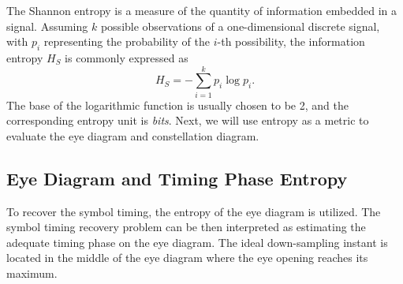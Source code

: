 \documentclass[journal,comsoc]{IEEEtran}
\begin{document}
The Shannon entropy is a measure of the quantity of information  embedded in a signal.
Assuming \(k\) possible observations of a one-dimensional discrete signal, with \(p_i\) representing the probability of the \(i\)-th possibility, the information entropy \(H_S\) is commonly expressed as \cite{Shannon1948}
\begin{equation}
H_S =  - \sum\limits_{i = 1}^k {{p_i}\log {p_i}}.
\label{eq:entropy}
\end{equation}
The base of the logarithmic function is usually chosen to be 2, and the corresponding entropy unit is \textit{bits}.
Next, we will use entropy as a metric to evaluate the eye diagram and constellation diagram.

\subsection{Eye Diagram and Timing Phase Entropy}
\label{sec:eye_entp}
To recover the symbol timing, the entropy of the eye diagram is utilized. 
The symbol timing recovery problem can be then interpreted as estimating the adequate timing phase on the eye diagram.
The ideal down-sampling instant is located in the middle of the eye diagram where the eye opening reaches its maximum.
\end{document}

